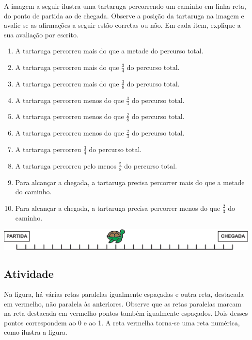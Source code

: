 A imagem a seguir ilustra uma tartaruga percorrendo um caminho em linha reta, do ponto de partida ao de chegada. Observe a posição da tartaruga na imagem e avalie se as afirmações a seguir estão corretas ou não. Em cada item, explique a sua avaliação por escrito.
\begin{enumerate} [\quad a)] %
  \item     A tartaruga percorreu mais do que a metade do percurso total.
  \item     A tartaruga percorreu mais do que     $\frac{3}{4}$     do percurso total.
  \item     A tartaruga percorreu mais do que     $\frac{3}{8}$     do percurso total.
  \item     A tartaruga percorreu menos do que     $\frac{3}{4}$     do percurso total.
  \item     A tartaruga percorreu menos do que     $\frac{2}{8}$     do percurso total.
  \item     A tartaruga percorreu menos do que     $\frac{2}{3}$     do percurso total.
  \item     A tartaruga percorreu     $\frac{3}{4}$     do percurso total.
  \item     A tartaruga percorreu pelo menos     $\frac{5}{8}$     do percurso total.
  \item     Para alcançar a chegada, a tartaruga precisa percorrer mais do que a metade do caminho.
  \item     Para alcançar a chegada, a tartaruga precisa percorrer menos do que     $\frac{2}{3}$     do caminho.
\end{enumerate} %

  \noindent\includegraphics[width=\textwidth, keepaspectratio]{..//media//cap3/secoes/png/ativ9_fig01.png}  

\subsection{Atividade}

Na figura, há várias retas paralelas igualmente espaçadas e outra reta, destacada em vermelho, não paralela às anteriores. Observe que as retas paralelas marcam na reta destacada em vermelho pontos também igualmente espaçados. Dois desses pontos correspondem ao 0 e ao 1. A reta vermelha torna-se uma reta numérica, como ilustra a figura. 

